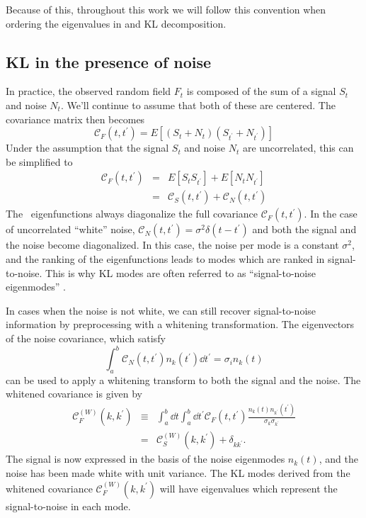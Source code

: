Because of this, throughout this work we will follow this convention when
ordering the eigenvalues in and KL decomposition.

\subsection{KL in the presence of noise}
\label{sec:whitening}
In practice, the observed random field $F_t$ is composed of the sum of
a signal $S_t$ and noise $N_t$.  We'll continue to assume that both of these
are centered.  The covariance matrix then becomes
\begin{equation}
  \mathcal{C}_F(t, t^\prime) = E[(S_t + N_t)(S_{t^\prime}+N_{t^\prime})]
\end{equation}
Under the assumption that the signal $S_t$ and noise $N_t$ are uncorrelated,
this can be simplified to
\begin{eqnarray}
  \mathcal{C}_F(t, t^\prime) &=& E[S_t S_{t^\prime}]
  + E[N_t N_{t^\prime}] \nonumber\\
  &=& \mathcal{C}_S(t, t^\prime) + \mathcal{C}_N(t, t^\prime)
\end{eqnarray}
The \KL\ eigenfunctions always diagonalize the full covariance
$\mathcal{C}_F(t, t^\prime)$.
In the case of uncorrelated ``white'' noise,
$\mathcal{C}_N(t, t^\prime) = \sigma^2 \delta(t - t^\prime)$
and both the signal and the noise become diagonalized.  In this case,
the noise per mode is a constant $\sigma^2$, and the ranking of the
eigenfunctions leads to modes which are ranked in signal-to-noise.
This is why KL modes are often referred to as ``signal-to-noise
eigenmodes'' \citep{Vogeley96}.

In cases when the noise is not white, we can still recover signal-to-noise
information by preprocessing with a whitening transformation.  The eigenvectors
of the noise covariance, which satisfy
\begin{equation}
  \int_a^b \mathcal{C}_N(t, t^\prime) n_k(t^\prime) \dd t^\prime 
  = \sigma_i n_k(t)
\end{equation}
can be used to apply a whitening transform to both the signal and the
noise.  The whitened covariance is given by
\begin{eqnarray}
  \mathcal{C}_F^{(W)}(k, k^\prime) &\equiv& \int_a^b\dd t\int_a^b\dd t^\prime
  \mathcal{C}_F(t, t^\prime)
  \frac{n_k(t) n_{k^\prime}(t^\prime)}{\sigma_k\sigma_{k^\prime}}\nonumber\\
  &=& \mathcal{C}_S^{(W)}(k, k^\prime) + \delta_{kk^\prime}.
\end{eqnarray}
The signal is now expressed in the basis of the noise eigenmodes $n_k(t)$,
and the noise has been made white with unit variance.  The KL modes derived
from the whitened covariance $\mathcal{C}_F^{(W)}(k, k^\prime)$ will have
eigenvalues which represent the signal-to-noise in each mode.

